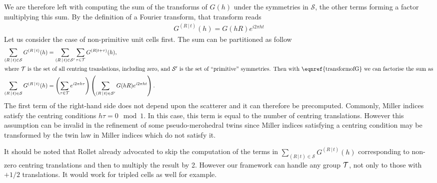 \documentclass[11pt]{article}
\newcommand{\sym}[2]{\left( #1\,\vert\, #2 \right)}
\begin{document}
We are therefore left with computing the sum of the transforms of $G(h)$ under the symmetries in $\mathcal{S}$, the other terms forming a factor multiplying this sum. By the definition of a Fourier transform, that transform reads
\begin{align}
G^{\sym{R}{t}}(h) = G(hR)e^{i 2\pi ht}
\label{eqn:transformofG}
\end{align}
Let us consider the case of non-primitive unit cells first. The sum can be partitioned as follow
\begin{align}
 \sum_{\sym{R}{t} \in \mathcal{S}} G^{\sym{R}{t}}(h) &=  \sum_{\sym{R}{t} \in \mathcal{S}'} \sum_{\tau \in \cal{T}} G^{(R \mid t+\tau)}(h), \nonumber\\
\intertext{where $\cal{T}$ is the set of all centring translations, including zero, and $\mathcal{S}'$ is the set of ``primitive'' symmetries. Then with \eqnref{transformofG} we can factorise the sum as}
\sum_{\sym{R}{t} \in \mathcal{S}} G^{\sym{R}{t}}(h) &= 
\left( \sum_{\tau \in \cal{T}} e^{i2\pi h\tau} \right)
\left( \sum_{\sym{R}{t} \in \mathcal{S}'} G(hR) e^{i2\pi ht} \right).
\label{eqn:structurefactor:centring:factorisation}
\end{align}
The first term of the right-hand side does not depend upon the scatterer and it can therefore be precomputed. Commonly, Miller indices satisfy the centring conditions $h\tau = 0 \mod 1$. In this case, this term is equal to the number of centring translations. However this assumption can be invalid in the refinement of some pseudo-merohedral twins since Miller indices satisfying a centring condition may be transformed by the twin law in Miller indices which do not satisfy it.

It should be noted that Rollet already advocated to skip the computation of the terms in $\sum_{\sym{R}{t} \in \mathcal{S}} G^{\sym{R}{t}}(h)$ corresponding to non-zero centring translations and then to multiply the result by 2. However our framework can handle any group $\cal{T}$, not only to those with $+1/2$ translations. It would work for tripled cells as well for example.
\end{document}
